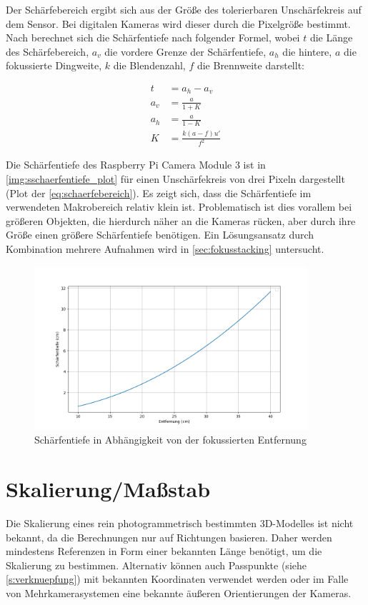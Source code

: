 \documentclass[./00PhotoBox.tex]{subfiles}
\begin{document}
Der Schärfebereich ergibt sich aus der Größe des tolerierbaren Unschärfekreis auf dem Sensor. Bei digitalen Kameras wird dieser durch die Pixelgröße bestimmt. Nach \citet[S. 148f]{luhmann} berechnet sich die Schärfentiefe nach folgender Formel, wobei $t$ die Länge des Schärfebereich, $a_v$ die vordere Grenze der Schärfentiefe, $a_h$ die hintere, $a$ die fokussierte Dingweite, $k$ die Blendenzahl, $f$ die Brennweite darstellt:

\begin{align}
    \label{eq:schaerfebereich}
    t   & = a_h - a_v            \\
    a_v & = \frac{a}{1+K}        \\
    a_h & = \frac{a}{1-K}        \\
    K   & = \frac{k(a-f)u'}{f^2}
\end{align}

Die Schärfentiefe des Raspberry Pi Camera Module 3 ist in \autoref{img:sschaerfentiefe_plot} für einen Unschärfekreis von drei Pixeln dargestellt (Plot der \autoref{eq:schaerfebereich}). Es zeigt sich, dass die Schärfentiefe im  verwendeten Makrobereich relativ klein ist. Problematisch ist dies vorallem bei größeren Objekten, die hierdurch näher an die Kameras rücken, aber durch ihre Größe einen größere Schärfentiefe benötigen. Ein Lösungsansatz durch Kombination mehrere Aufnahmen wird in \autoref{sec:fokusstacking} untersucht.

\begin{figure}
    \centering
    \includegraphics[width=0.9\textwidth]{./img/schaerfentiefe_plot.png}
    \caption{Schärfentiefe in Abhängigkeit von der fokussierten Entfernung} %
    \label{img:sschaerfentiefe_plot} %
\end{figure}


\section{Skalierung/Maßstab}
\label{sec:massstab}
Die Skalierung eines rein photogrammetrisch bestimmten 3D-Modelles ist nicht bekannt, da die Berechnungen nur auf Richtungen basieren. Daher werden mindestens Referenzen in Form einer bekannten Länge benötigt, um die Skalierung zu bestimmen. Alternativ können auch Passpunkte (siehe \autoref{s:verknuepfung}) mit bekannten Koordinaten verwendet werden oder im Falle von Mehrkamerasystemen eine bekannte äußeren Orientierungen der Kameras. \citep[S. 546]{luhmann}
\end{document}
